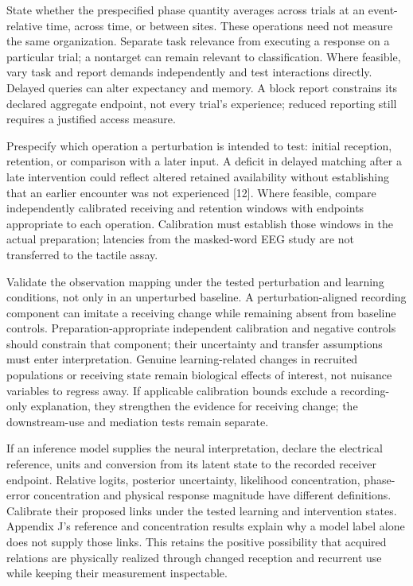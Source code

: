 \documentclass[
  american,
  11pt,
  letterpaper,
]{article}
\begin{document}
State whether the prespecified phase quantity averages across trials at an event-relative time, across time, or between sites. These operations need not measure the same organization. Separate task relevance from executing a response on a particular trial; a nontarget can remain relevant to classification. Where feasible, vary task and report demands independently and test interactions directly. Delayed queries can alter expectancy and memory. A block report constrains its declared aggregate endpoint, not every trial's experience; reduced reporting still requires a justified access measure.

Prespecify which operation a perturbation is intended to test: initial reception, retention, or comparison with a later input. A deficit in delayed matching after a late intervention could reflect altered retained availability without establishing that an earlier encounter was not experienced {[}12{]}. Where feasible, compare independently calibrated receiving and retention windows with endpoints appropriate to each operation. Calibration must establish those windows in the actual preparation; latencies from the masked-word EEG study are not transferred to the tactile assay.

Validate the observation mapping under the tested perturbation and learning conditions, not only in an unperturbed baseline. A perturbation-aligned recording component can imitate a receiving change while remaining absent from baseline controls. Preparation-appropriate independent calibration and negative controls should constrain that component; their uncertainty and transfer assumptions must enter interpretation. Genuine learning-related changes in recruited populations or receiving state remain biological effects of interest, not nuisance variables to regress away. If applicable calibration bounds exclude a recording-only explanation, they strengthen the evidence for receiving change; the downstream-use and mediation tests remain separate.

If an inference model supplies the neural interpretation, declare the electrical reference, units and conversion from its latent state to the recorded receiver endpoint. Relative logits, posterior uncertainty, likelihood concentration, phase-error concentration and physical response magnitude have different definitions. Calibrate their proposed links under the tested learning and intervention states. Appendix J's reference and concentration results explain why a model label alone does not supply those links. This retains the positive possibility that acquired relations are physically realized through changed reception and recurrent use while keeping their measurement inspectable.
\end{document}
